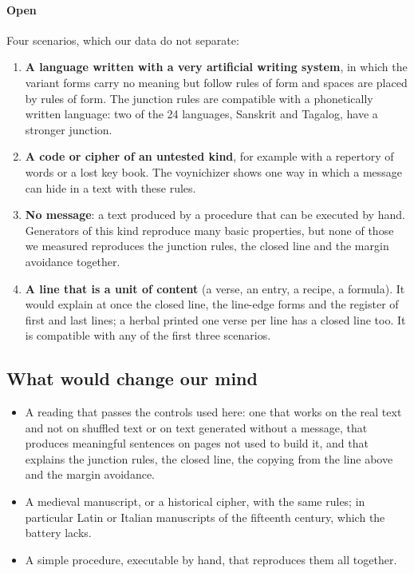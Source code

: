 \paragraph{Open} Four scenarios, which our data do not separate:
\begin{enumerate}
\item \textbf{A language written with a very artificial writing system}, in which the variant forms carry no meaning but
  follow rules of form and spaces are placed by rules of form. The junction rules are compatible with a phonetically
  written language: two of the 24 languages, Sanskrit and Tagalog, have a stronger junction.
\item \textbf{A code or cipher of an untested kind}, for example with a repertory of words or a lost key book. The
  voynichizer shows one way in which a message can hide in a text with these rules.
\item \textbf{No message}: a text produced by a procedure that can be executed by hand. Generators of this kind
  reproduce many basic properties, but none of those we measured reproduces the junction rules, the closed line and the
  margin avoidance together.
\item \textbf{A line that is a unit of content} (a verse, an entry, a recipe, a formula). It would explain at once the
  closed line, the line-edge forms and the register of first and last lines; a herbal printed one verse per line has a
  closed line too. It is compatible with any of the first three scenarios.
\end{enumerate}

\subsection{What would change our mind}

\begin{itemize}
\item A reading that passes the controls used here: one that works on the real text and not on shuffled text or on
  text generated without a message, that produces meaningful sentences on pages not used to build it, and that explains
  the junction rules, the closed line, the copying from the line above and the margin avoidance.
\item A medieval manuscript, or a historical cipher, with the same rules; in particular Latin or Italian manuscripts of
  the fifteenth century, which the battery lacks.
\item A simple procedure, executable by hand, that reproduces them all together.
\end{itemize}

